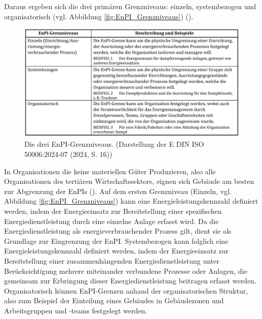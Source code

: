 Daraus ergeben sich die drei primären Grenzniveaus: einzeln, systembezogen und organisatorisch (vgl. Abbildung \eqref{fig:EnPI_Grenzniveaus}) (\cite[Kapitel 5.3]{DIN50006.2024}). 
\begin{figure}[H]
    \centering
    \includegraphics[width=1\textwidth]{../../Ressourcen/Abbildungen/EnPI_Grenzniveaus_ISO_50006.jpg}
    \caption{Die drei EnPI-Grenzniveaus. (Darstellung der E DIN ISO 50006:2024-07 (2024, S. 16))}
    \label{fig:EnPI_Grenzniveaus}
\end{figure}
In Organisationen die keine materiellen Güter Produzieren, also alle Organisationen des tertiären Wirtschaftssektors, eignen sich Gebäude am besten zur 
Abgrenzung der EnPIs (\cite[S. 9]{Fichera.2020}). 
Auf dem ersten Grenzniveau (Einzeln, vgl. Abbildung \eqref{fig:EnPI_Grenzniveaus}) kann eine Energieleistungskennzahl definiert werden, indem der Energieeinsatz 
zur Bereitstellung einer spezifischen Energiedienstleistung durch eine einzelne Anlage erfasst wird. Da die Energiedienstleistung als energieverbrauchender 
Prozess gilt, dient sie als Grundlage zur Eingrenzung der EnPI.
Systembezogen kann folglich eine Energieleistungskennzahl definiert werden, indem der Energieeinsatz zur Bereitstellung einer zusammenhängenden Energiedienstleistung 
unter Berücksichtigung mehrere miteinander verbundene Prozesse oder Anlagen, die gemeinsam zur Erbringung dieser Energiedienstleistung beitragen erfasst werden. 
Organisatorisch können EnPI-Grenzen anhand der organisatorischen Struktur, also zum Beispiel der Einteilung eines Gebäudes in Gebäudezonen und Arbeitsgruppen und -teams 
festgelegt werden.